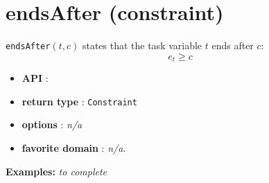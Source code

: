 \section{endsAfter (constraint)}\label{endsafter:endsafterconstraint}\hypertarget{endsafter:endsafterconstraint}{}
\begin{notedef}
  \texttt{endsAfter}$(t,c)$ states that the task variable $t$ ends after $c$:
  $$e_t \ge c$$
\end{notedef}

\begin{itemize}
	\item \textbf{API} :
	\item \textbf{return type} : \texttt{Constraint}
	\item \textbf{options} : \emph{n/a}
	\item \textbf{favorite domain} : \emph{n/a}.
\end{itemize}

\textbf{Examples:}
%
\emph{to complete}